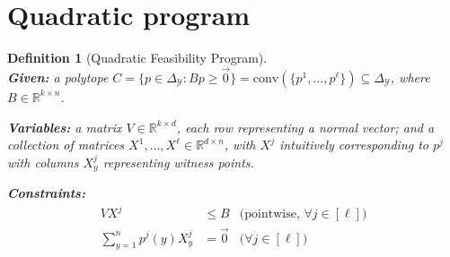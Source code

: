 \documentclass[12pt]{article}
\newcommand{\reals}{\mathbb{R}}
\newcommand{\simplex}{\Delta_\Y}
\newcommand{\Y}{\mathcal{Y}}
\newcommand{\inprod}[2]{\langle #1, #2 \rangle}%
\newcommand{\conv}{\mathrm{conv}}
\newtheorem{definition}{Definition}
\begin{document}
  \section{Quadratic program}
  
  \begin{definition}[Quadratic Feasibility Program] ~ \\
    \indent \textbf{Given:} a polytope $C = \{p \in \simplex : Bp \geq \vec 0\} = \conv(\{p^1, \ldots, p^\ell\}) \subseteq \simplex$, where $B \in \reals^{k \times n}$.

    \textbf{Variables:} a matrix $V \in \reals^{k \times d}$, each row representing a normal vector; and a collection of matrices $X^1,\ldots,X^{\ell} \in \reals^{d \times n}$, with $X^j$ intuitively corresponding to $p^j$ with columns $X^j_y$ representing witness points.

    \textbf{Constraints:}
      \begin{align}
        V X^j            &\leq B    & \text{(pointwise, $\forall j \in [\ell]$)}  \label{eqn:qp-constr-1} \\
        \sum_{y=1}^n p^j(y) X^j_y &= \vec 0  & \text{($\forall j \in [\ell]$)}    \label{eqn:qp-constr-2} 
      \end{align}
  \end{definition}
\end{document}
